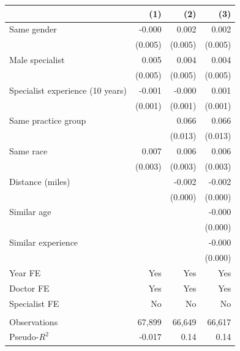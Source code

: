 
\begin{tabular}{lrrr}
\toprule
  & (1) & (2) & (3)\\
\midrule
Same gender & -0.000 & 0.002 & 0.002\\
 & (0.005) & (0.005) & \vphantom{1} (0.005)\\
Male specialist & 0.005 & 0.004 & 0.004\\
 & (0.005) & (0.005) & (0.005)\\
Specialist experience (10 years) & -0.001 & -0.000 & 0.001\\
 & (0.001) & (0.001) & (0.001)\\
Same practice group &  & 0.066 & 0.066\\
 &  & (0.013) & (0.013)\\
Same race & 0.007 & 0.006 & 0.006\\
 & (0.003) & (0.003) & (0.003)\\
Distance (miles) &  & -0.002 & -0.002\\
 &  & (0.000) & (0.000)\\
Similar age &  &  & -0.000\\
 &  &  & \vphantom{1} (0.000)\\
Similar experience &  &  & -0.000\\
 &  &  & (0.000)\\
\midrule
Year FE & Yes & Yes & Yes\\
Doctor FE & Yes & Yes & Yes\\
Specialist FE & No & No & No\\
\midrule\\
Observations & 67,899 & 66,649 & 66,617\\
Pseudo-$R^2$ & -0.017 & 0.14 & 0.14\\
\bottomrule
\end{tabular}
